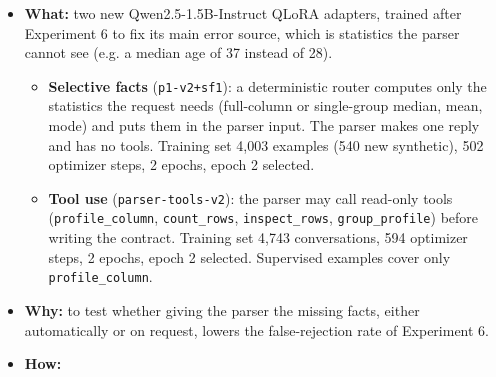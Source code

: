 \documentclass[11pt]{article}
\providecommand{\tightlist}{\setlength{\itemsep}{0pt}\setlength{\parskip}{0pt}}
\begin{document}
\begin{itemize}
\tightlist
\item
  \textbf{What:} two new Qwen2.5-1.5B-Instruct QLoRA adapters, trained
  after Experiment 6 to fix its main error source, which is statistics
  the parser cannot see (e.g. a median age of 37 instead of 28).

  \begin{itemize}
  \tightlist
  \item
    \textbf{Selective facts} (\texttt{p1-v2+sf1}): a deterministic
    router computes only the statistics the request needs (full-column
    or single-group median, mean, mode) and puts them in the parser
    input. The parser makes one reply and has no tools. Training set
    4,003 examples (540 new synthetic), 502 optimizer steps, 2 epochs,
    epoch 2 selected.
  \item
    \textbf{Tool use} (\texttt{parser-tools-v2}): the parser may call
    read-only tools (\texttt{profile\_\allowbreak{}column},
    \texttt{count\_\allowbreak{}rows},
    \texttt{inspect\_\allowbreak{}rows},
    \texttt{group\_\allowbreak{}profile}) before writing the contract.
    Training set 4,743 conversations, 594 optimizer steps, 2 epochs,
    epoch 2 selected. Supervised examples cover only
    \texttt{profile\_\allowbreak{}column}.
  \end{itemize}
\item
  \textbf{Why:} to test whether giving the parser the missing facts,
  either automatically or on request, lowers the false-rejection rate of
  Experiment 6.
\item
  \textbf{How:}


\end{itemize}
\end{document}
